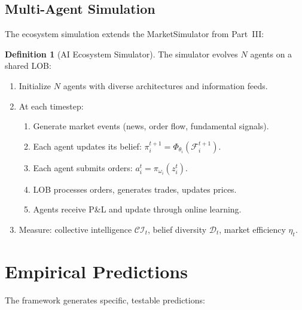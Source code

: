 \documentclass[12pt,a4paper]{article}
\theoremstyle{definition}
\newtheorem{definition}[theorem]{Definition}
\newcommand{\F}{\mathcal{F}}
\begin{document}
\subsection{Multi-Agent Simulation}

The ecosystem simulation extends the MarketSimulator from Part~III:

\begin{definition}[AI Ecosystem Simulator]\label{def:simulator}
The simulator evolves $N$ agents on a shared LOB:
\begin{enumerate}
  \item Initialize $N$ agents with diverse architectures and information feeds.
  \item At each timestep:
    \begin{enumerate}
      \item Generate market events (news, order flow, fundamental signals).
      \item Each agent updates its belief: $\pi_i^{t+1} = \Phi_{\theta_i}(\F_i^{t+1})$.
      \item Each agent submits orders: $a_i^t = \pi_{\omega_i}(z_i^t)$.
      \item LOB processes orders, generates trades, updates prices.
      \item Agents receive P\&L and update through online learning.
    \end{enumerate}
  \item Measure: collective intelligence $\mathcal{CI}_t$, belief diversity $\mathcal{D}_t$, market efficiency $\eta_t$.
\end{enumerate}
\end{definition}

\section{Empirical Predictions}\label{sec:empirical}

The framework generates specific, testable predictions:
\end{document}
